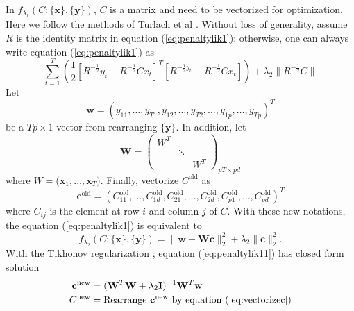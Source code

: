 \documentclass[fleqn]{article}
\let\oldref\ref
\renewcommand{\ref}[1]{(\oldref{#1})}
\newcommand{\T}{T}
\begin{document}
In $f_{\lambda_1}(C;\{\mathbf{x}\},\{\mathbf{y}\})$, $C$ is a matrix and need to be vectorized for optimization. Here we follow the methods of Turlach et al \cite{turlach2005simultaneous}. Without loss of generality, assume $R$ is the identity matrix in equation \ref{eq:penaltylik1}; otherwise, one can always write equation \ref{eq:penaltylik1} as
\begin{equation*}
\sum\limits_{t=1}^{T}\left(\frac{1}{2}[R^{-\frac{1}{2}}y_t-R^{-\frac{1}{2}}Cx_t]^{\T}[R^{-\frac{1}{2}y_t}-R^{-\frac{1}{2}}Cx_t]\right) + \lambda_2 \|R^{-\frac{1}{2}}C\|
\end{equation*}
Let
\begin{equation*}
\mathbf{w} = (y_{11},\ldots,y_{T1},y_{12},\ldots,y_{T2},\ldots,y_{1p},\ldots,y_{Tp})^{\T}
\end{equation*}
be a $Tp\times 1$ vector from rearranging  $\{\mathbf{y}\}$. In addition, let
\[
\mathbf{W} = \begin{pmatrix}
W^{\T}&&\\
&\ddots&\\
&&W^{\T}
\end{pmatrix}_{pT\times pd}
\]
where $W=\biggl(\mathbf{x}_1,\ldots,\mathbf{x}_{T}\biggr)$. Finally, vectorize $C^{\text{old}}$ as
\begin{equation}\label{eq:vectorizec}
\mathbf{c}^{\text{old}} = (C_{11}^{\text{old}},\ldots,C_{1d}^{\text{old}},C_{21}^{\text{old}},\ldots,C_{2d}^{\text{old}},C_{p1}^{\text{old}},\ldots,C_{pd}^{\text{old}})^{\T}
\end{equation}
where $C_{ij}$ is the element at row $i$ and column $j$ of $C$. With these new notations, the equation \ref{eq:penaltylik1} is equivalent to
\begin{equation}\label{eq:penaltylik11}
f_{\lambda_2}(C;\{\mathbf{x}\},\{\mathbf{y}\}) = \|\mathbf{w}  - \mathbf{Wc}\|_2^2 + \lambda_2\|\mathbf{c}\|_2^2.
\end{equation}
With the Tikhonov regularization \cite{tikhonov1943stability}, equation \ref{eq:penaltylik11} has closed form solution
\begin{equation}\label{eq:updatec}
\begin{aligned}
\mathbf{c}^{\text{new}} &= (\mathbf{W}^{\T}\mathbf{W} + \lambda_2\mathbf{I})^{-1}\mathbf{W}^{\T}\mathbf{w}\\
C^{\text{new}} &=\text{Rearrange } \mathbf{c}^{\text{new}} \text{ by equation }\ref{eq:vectorizec}
\end{aligned}
\end{equation}
\end{document}
